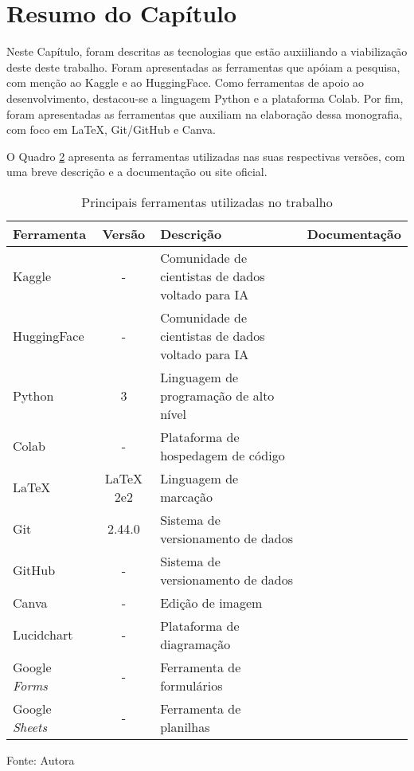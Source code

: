\section{Resumo do Capítulo}\label{sec:resumosuptec}
Neste Capítulo, foram descritas as tecnologias que estão auxiiliando a viabilização deste deste trabalho. Foram apresentadas as 
ferramentas que apóiam a pesquisa, com menção ao Kaggle e ao HuggingFace. 
Como ferramentas de apoio ao desenvolvimento, destacou-se a linguagem Python e a plataforma Colab. 
Por fim, foram apresentadas as ferramentas que auxiliam na elaboração dessa monografia, com foco em LaTeX, Git/GitHub e Canva.

O Quadro \hyperref[tab:2]{2} apresenta as ferramentas utilizadas nas suas respectivas versões, com uma breve descrição e a documentação ou site 
oficial.

\begin{table}[htbp]
    \centering
    \begin{threeparttable}
        \caption{Principais ferramentas utilizadas no trabalho}
        \label{tab:2}
        \begin{tabular}{>{\centering\arraybackslash}m{3cm} c m{5cm} c}
        \toprule 
        Ferramenta & Versão & Descrição & Documentação \\
        \midrule
        Kaggle & - & Comunidade de cientistas de dados voltado para IA & \cite{kagglesite} \\
        \hline 
        HuggingFace & - & Comunidade de cientistas de dados voltado para IA & \cite{huggingsite} \\
        \hline 
        Python & 3 & Linguagem de programação de alto nível & \cite{pythonsite} \\
        \hline 
        Colab & - & Plataforma de hospedagem de código & \cite{colabsite} \\
        \hline 
        LaTeX & LaTeX 2e2 & Linguagem de marcação & \cite{latexsite} \\
        \hline 
        Git & 2.44.0 & Sistema de versionamento de dados & \cite{gitsite} \\
        \hline 
        GitHub & - & Sistema de versionamento de dados & \cite{githubsite} \\
        \hline 
        Canva & - & Edição de imagem & \cite{canva} \\
        \hline 
        Lucidchart & - & Plataforma de diagramação & \cite{lucidchart} \\
        \hline 
        Google \textit{Forms} & - & Ferramenta de formulários  & \cite{forms} \\
        \hline 
        Google \textit{Sheets} & - & Ferramenta de planilhas  & \cite{sheets} \\
        \bottomrule 
        \end{tabular}
        \begin{tablenotes}
            \small
            \centering
            \item Fonte: Autora
        \end{tablenotes}
    \end{threeparttable}
\end{table}
